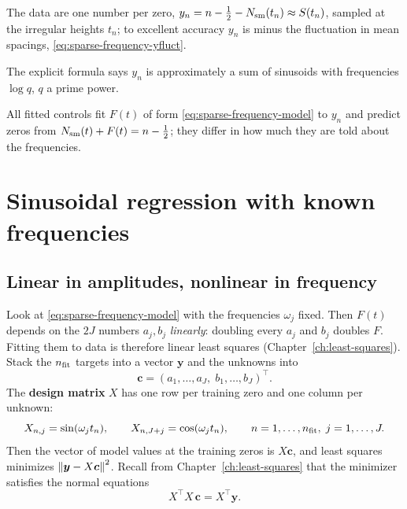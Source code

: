 \begin{keyideas}
\item The data are one number per zero, $y_n=n-\tfrac12-N_{\mathrm{sm}}(t_n)\approx S(t_n)$, sampled at the irregular heights $t_n$; to excellent accuracy $y_n$ is minus the fluctuation in mean spacings, \eqref{eq:sparse-frequency-yfluct}.
\item The explicit formula says $y_n$ is approximately a sum of sinusoids with frequencies $\log q$, $q$ a prime power.
\item All fitted controls fit $F(t)$ of form \eqref{eq:sparse-frequency-model} to $y_n$ and predict zeros from $N_{\mathrm{sm}}(t)+F(t)=n-\tfrac12$; they differ in how much they are told about the frequencies.
\end{keyideas}

\section{Sinusoidal regression with known frequencies}\label{sec:sparse-frequency-known}

\subsection{Linear in amplitudes, nonlinear in frequency}

Look at \eqref{eq:sparse-frequency-model} with the frequencies $\omega_j$ fixed. Then $F(t)$ depends on the $2J$ numbers $a_j,b_j$ \emph{linearly}: doubling every $a_j$ and $b_j$ doubles $F$. Fitting them to data is therefore linear least squares (Chapter~\ref{ch:least-squares}). Stack the $n_{\rm fit}$ targets into a vector $\bm y$ and the unknowns into
\begin{equation}
\bm c=(a_1,\dots,a_J,\;b_1,\dots,b_J)^\top .
\end{equation}
The \textbf{design matrix} $X$ has one row per training zero and one column per unknown:
\begin{equation}
X_{n,j}=\sin(\omega_j t_n),\qquad X_{n,J+j}=\cos(\omega_j t_n),\qquad n=1,\dots,n_{\rm fit},\; j=1,\dots,J.
\label{eq:sparse-frequency-design}
\end{equation}
Then the vector of model values at the training zeros is $X\bm c$, and least squares minimizes $\left\lVert \bm y-X\bm c\right\rVert^2$. Recall from Chapter~\ref{ch:least-squares} that the minimizer satisfies the normal equations
\begin{equation}
X^\top X\,\bm c = X^\top\bm y .
\label{eq:sparse-frequency-normal}
\end{equation}

